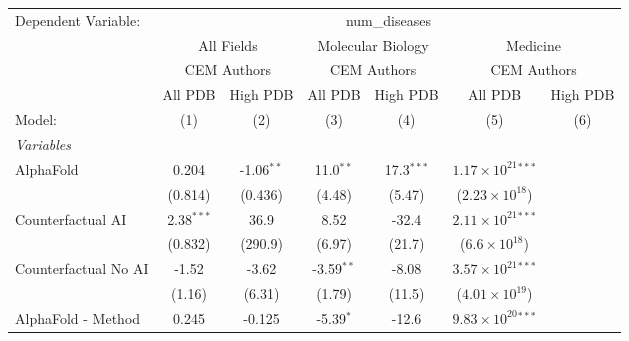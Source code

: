 \begingroup
\centering
\begin{tabular}{lcccccc}
   \tabularnewline \midrule \midrule
   Dependent Variable: & \multicolumn{6}{c}{num\_diseases}\\
 & \multicolumn{2}{c}{All Fields} & \multicolumn{2}{c}{Molecular Biology} & \multicolumn{2}{c}{Medicine} \\
\cmidrule(lr){2-3} \cmidrule(lr){4-5} \cmidrule(lr){6-7}
 & \multicolumn{2}{c}{CEM Authors} & \multicolumn{2}{c}{CEM Authors} & \multicolumn{2}{c}{CEM Authors} \\
\cmidrule(lr){2-3} \cmidrule(lr){4-5} \cmidrule(lr){6-7}
 & \multicolumn{1}{c}{All PDB} & \multicolumn{1}{c}{High PDB} & \multicolumn{1}{c}{All PDB} & \multicolumn{1}{c}{High PDB} & \multicolumn{1}{c}{All PDB} & \multicolumn{1}{c}{High PDB} \\
\cmidrule(lr){2-2} \cmidrule(lr){3-3} \cmidrule(lr){4-4} \cmidrule(lr){5-5} \cmidrule(lr){6-6} \cmidrule(lr){7-7}
   Model:                                                     & (1)          & (2)          & (3)          & (4)          & (5)                            & (6)\\  
   \midrule
   \emph{Variables}\\
   AlphaFold                                                  & 0.204        & -1.06$^{**}$ & 11.0$^{**}$  & 17.3$^{***}$ & $1.17\times 10^{21}$$^{***}$   &   \\   
                                                              & (0.814)      & (0.436)      & (4.48)       & (5.47)       & ($2.23\times 10^{18}$)         &   \\   
   Counterfactual AI                                          & 2.38$^{***}$ & 36.9         & 8.52         & -32.4        & $2.11\times 10^{21}$$^{***}$   &   \\   
                                                              & (0.832)      & (290.9)      & (6.97)       & (21.7)       & ($6.6\times 10^{18}$)          &   \\   
   Counterfactual No AI                                       & -1.52        & -3.62        & -3.59$^{**}$ & -8.08        & $3.57\times 10^{21}$$^{***}$   &   \\   
                                                              & (1.16)       & (6.31)       & (1.79)       & (11.5)       & ($4.01\times 10^{19}$)         &   \\   
   AlphaFold - Method                                         & 0.245        & -0.125       & -5.39$^{*}$  & -12.6        & $9.83\times 10^{20}$$^{***}$   &   \\   

\end{tabular}
